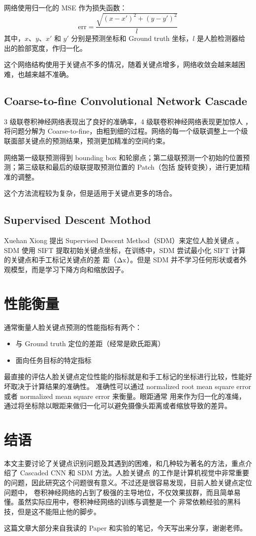 \documentclass{ctexart}
\begin{document}
网络使用归一化的 MSE 作为损失函数：
$$
\mathrm{err} = \frac { \sqrt{ (x - x')^2 + (y - y')^2 } } {l}
$$
其中，$x$、$y$、$x'$ 和 $y'$ 分别是预测坐标和 Ground truth 坐标，$l$ 是人脸检测器给出的脸部宽度，作归一化。

这个网络结构使用于关键点不多的情况，随着关键点增多，网络收敛会越来越困难，也越来越不准确。

\subsection{Coarse-to-fine Convolutional Network Cascade}

3 级联卷积神经网络表现出了良好的准确率，4 级联卷积神经网络表现更加惊人 \cite{cascaded4_cnn}，将问题分解为 Coarse-to-fine，由粗到细的过程。网络的每一个级联调整上一个级联面部关键点的预测结果，预测更加精准的空间约束。

网络第一级联预测得到 bounding box 和轮廓点；第二级联预测一个初始的位置预测；第三级联和最后的级联提取预测位置的 Patch（包括
旋转变换），进行更加精准的调整。

这个方法流程较为复杂，但是适用于关键点更多的场合。

\subsection{Supervised Descent Mothod}

Xuehan Xiong 提出 Supervised Descent Method（SDM）来定位人脸关键点 \cite{sdm}。
SDM 使用 SIFT 提取初始关键点坐标，在训练中，SDM 尝试最小化 SIFT 计算的关键点和手工标记关键点的差
距（$\Delta \rm{x}$）。但是 SDM 并不学习任何形状或者外观模型，而是学习下降方向和缩放因子。

\section{性能衡量}

通常衡量人脸关键点预测的性能指标有两个：

\begin{itemize}
	\item 与 Ground truth 定位的差距（经常是欧氏距离）
	\item 面向任务目标的特定指标
\end{itemize}

最直接的评估人脸关键点定位性能的指标就是和手工标记的坐标进行比较，性能好坏取决于计算结果的准确性。
准确性可以通过 normalized root mean square error 或者 normalized mean square error 来衡量。眼距通常
用来作为归一化的准绳，通过将坐标除以眼距来做归一化可以避免摄像头距离或者缩放导致的差异。

\section{结语}

本文主要讨论了关键点识别问题及其遇到的困难，和几种较为著名的方法，重点介绍了 Cascaded CNN 和 SDM 方法。人脸关键点
的工作是计算机视觉中非常重要的问题，因此研究这个问题很有意义。不过还是很容易发现，目前人脸关键点定位问题中，
卷积神经网络的占到了极强的主导地位，不仅效果拔群，而且简单易懂。虽然实际应用中，卷积神经网络的训练与调整是一个
非常依赖经验的黑科技，但是这不能阻止他的脚步。

这篇文章大部分来自我读的 Paper 和实验的笔记，今天写出来分享，谢谢老师。

\pagebreak

\end{document}
